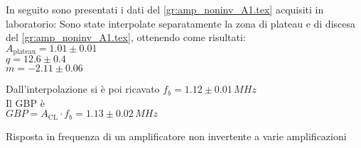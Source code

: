 In seguito sono presentati i dati del  \autoref{gr:amp_noninv_A1.tex} acquisiti in laboratorio:
%   
Sono state interpolate separatamente la zona di plateau e di discesa del  \autoref{gr:amp_noninv_A1.tex}, ottenendo come risultati:\\
$A_\textrm{plateau}=1.01 \pm 0.01$\\
$q = 12.6 \pm 0.4$\\
$m  = -2.11 \pm 0.06$

Dall'interpolazione si è poi ricavato 
$f_b=1.12\pm 0.01 \,MHz $\\
Il GBP è\\
$GBP=A_\textrm{CL} \cdot f_b  = 1.13 \pm 0.02 \,MHz$




\begin{grafico}
 \centering 
  \resizebox{\textwidth}{!}{%
  
 }%
 \caption{Risposta in frequenza di un amplificatore non invertente a varie amplificazioni} 
 \label{gr:amp_noninv_all.tex} 
\end{grafico}


